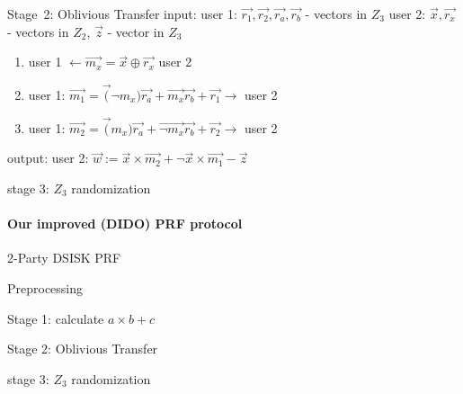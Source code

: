 \begin{algorithm}
\begin{algorithmic}
\STATE Stage\ 2: Oblivious Transfer
input: 	 user 1:  $\vec{r_1}, \vec{r_2}, \vec{r_a}, \vec{r_b}$ - vectors in $Z_3$
			user 2:  $\vec{x}, \vec{r_x}$ - vectors in $Z_2$, $\vec{z} $ - vector in $Z_3$
			
			
			\begin{enumerate}
				\item user 1  $ \leftarrow   \vec{m_x} = \vec{x} \oplus \vec{r_x}$   user 2
			 
				\item user 1:  $  \vec{m_1} = \vec(\neg m_x)  \vec{r_a} + \vec{m_x} \vec{r_b} + \vec{r_1}   \rightarrow $   user 2
				
				\item user 1:  $  \vec{m_2} = \vec(m_x)  \vec{r_a} + \vec{\neg m_x} \vec{r_b} + \vec{r_2}  \rightarrow $   user 2
				
				
			\end{enumerate}
			
output:  user 2: $\vec{w}:= \vec{x} \times \vec{m_2}+ \neg \vec{x}  \times \vec{m_1} - \vec{z}$
					

\STATE stage 3: $Z_3$ randomization  

\end{algorithmic}

\end{algorithm}





\paragraph{Our improved (DIDO) PRF protocol}

\begin{algorithm}
	\caption{2-Party DSISK PRF}
	\begin{algorithmic}
		
		\STATE Preprocessing
		
		\STATE Stage 1: calculate $a \times b \plus c$
		
		\STATE Stage 2: Oblivious Transfer
		
		\STATE stage 3: $Z_3$ randomization  
		
	\end{algorithmic}
\end{algorithm}





